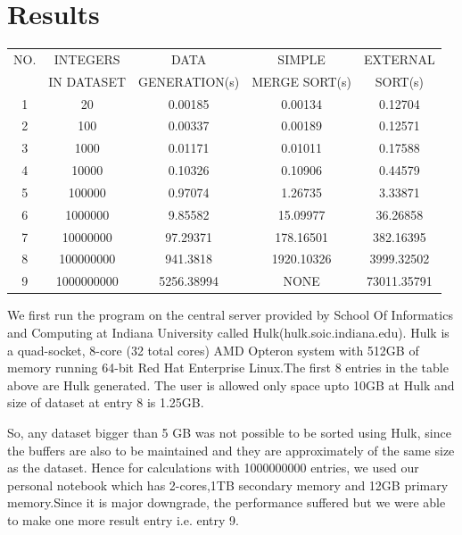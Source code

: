 \documentclass[12pt]{article}
\begin{document}
\section{Results}

\begin{center}
 \begin{tabular}{|c|c|c|c|c|} 
 \hline
NO.& INTEGERS&DATA&SIMPLE&EXTERNAL \\ [0.5ex] 
& IN DATASET&GENERATION(s)&MERGE SORT(s)& SORT(s) \\ [0.5ex] 
 \hline\hline
1& 20&			0.00185&	0.00134&	0.12704\\
 \hline
 2&100&			0.00337&	0.00189&	0.12571\\
 \hline
3&1000&			0.01171&	0.01011&	0.17588\\
 \hline
4&10000&		0.10326&	0.10906&	0.44579\\
 \hline
5&100000&		0.97074&	1.26735&	3.33871\\
 \hline
6&1000000&		9.85582&	15.09977&	36.26858\\
 \hline
7&10000000&		97.29371&	178.16501&	382.16395\\
 \hline
8&100000000&		941.3818&	1920.10326&	3999.32502\\
 \hline			
9&1000000000&	5256.38994&NONE&		73011.35791\\ [1ex] 
 \hline
\end{tabular}
\end{center}

\par
We first run the program on the central server provided by School Of Informatics and Computing at Indiana University called Hulk(hulk.soic.indiana.edu). Hulk is a quad-socket, 8-core (32 total cores) AMD Opteron system with 512GB of memory running 64-bit Red Hat Enterprise Linux.The first 8 entries in the table above are Hulk generated. The user is allowed only space upto 10GB at Hulk and size of dataset at entry 8 is 1.25GB.\\
\par
So, any dataset bigger than 5 GB was not possible to be sorted using Hulk, since the buffers are also to be maintained and they are approximately of the same size as the dataset. Hence for calculations with 1000000000 entries, we used our personal notebook which has 2-cores,1TB secondary memory and 12GB primary memory.Since it is major downgrade, the performance suffered but we were able to make one more result entry i.e. entry 9.    
\end{document}
